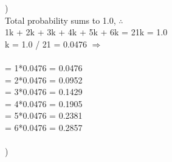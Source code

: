 \documentclass[12pt]{article}
\begin{document}
)\\
\indent \indent Total probability sums to 1.0, $\therefore$\\
\indent \indent 1k + 2k + 3k + 4k + 5k + 6k = 21k = 1.0\\
\indent \indent k = 1.0 / 21 = 0.0476 $\Rightarrow$\\\\
\indent \indent [1] = 1*0.0476 = 0.0476\\
\indent \indent [2] = 2*0.0476 = 0.0952\\
\indent \indent [3] = 3*0.0476 = 0.1429\\
\indent \indent [4] = 4*0.0476 = 0.1905\\
\indent \indent [5] = 5*0.0476 = 0.2381\\
\indent \indent [6] = 6*0.0476 = 0.2857\\


\hrulefill \\


)\\



\pagebreak
\hrulefill \\
\end{document}
